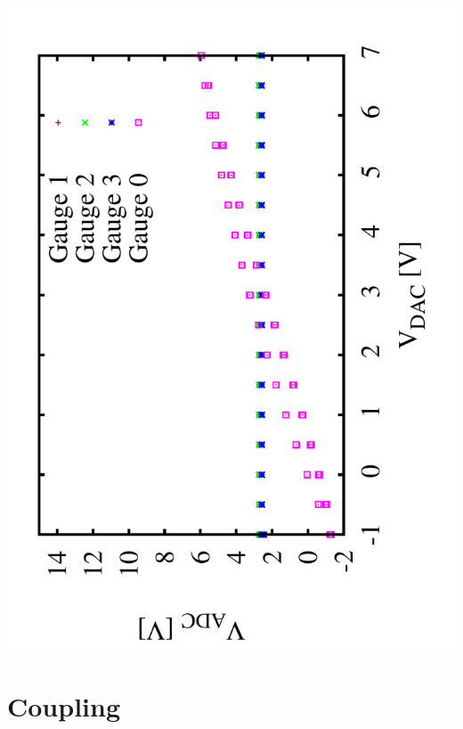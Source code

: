 \documentclass[a4paper,11pt]{book}
\begin{document}
 \includegraphics[angle=-90,scale=0.15]{image_ai_14.pdf}\\ 


\section{Coupling}
\end{document}
